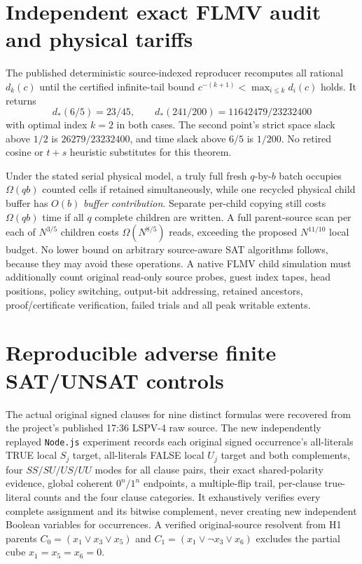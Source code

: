 \documentclass[11pt]{article}
\begin{document}
\section{Independent exact FLMV audit and physical tariffs}
The published deterministic source-indexed reproducer recomputes all rational $d_k(c)$ until the certified infinite-tail bound $c^{-(k+1)}<\max_{i\le k}d_i(c)$ holds. It returns
\[
d_*(6/5)=23/45,\qquad
d_*(241/200)=11642479/23232400
\]
with optimal index $k=2$ in both cases. The second point's strict space slack above $1/2$ is $26279/23232400$, and time slack above $6/5$ is $1/200$. No retired cosine or $t+s$ heuristic substitutes for this theorem.

Under the stated serial physical model, a truly full fresh $q$-by-$b$ batch occupies $\Omega(qb)$ counted cells if retained simultaneously, while one recycled physical child buffer has $O(b)$ \emph{buffer contribution}. Separate per-child copying still costs $\Omega(qb)$ time if all $q$ complete children are written. A full parent-source scan per each of $N^{3/5}$ children costs $\Omega(N^{8/5})$ reads, exceeding the proposed $N^{11/10}$ local budget. No lower bound on arbitrary source-aware SAT algorithms follows, because they may avoid these operations. A native FLMV child simulation must additionally count original read-only source probes, guest index tapes, head positions, policy switching, output-bit addressing, retained ancestors, proof/certificate verification, failed trials and all peak writable extents.

\section{Reproducible adverse finite SAT/UNSAT controls}
The actual original signed clauses for nine distinct formulas were recovered from the project's published 17:36 LSPV-4 raw source. The new independently replayed \texttt{Node.js} experiment records each original signed occurrence's all-literals TRUE local $S_j$ target, all-literals FALSE local $U_j$ target and both complements, four $SS/SU/US/UU$ modes for all clause pairs, their exact shared-polarity evidence, global coherent $0^n/1^n$ endpoints, a multiple-flip trail, per-clause true-literal counts and the four clause categories. It exhaustively verifies every complete assignment and its bitwise complement, never creating new independent Boolean variables for occurrences. A verified original-source resolvent from H1 parents $C_0=(x_1\vee x_3\vee x_5)$ and $C_1=(x_1\vee\neg x_3\vee x_6)$ excludes the partial cube $x_1=x_5=x_6=0$.
\end{document}
